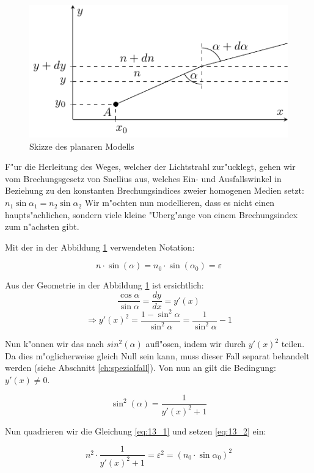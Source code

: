 \begin{refsection}
\begin{figure}
\centering
\includegraphics{licht/standalone/fig_planar_skizze.pdf}
\caption{Skizze des planaren Modells}
\label{fig:13_1}
\end{figure}

F"ur die Herleitung des Weges, welcher der Lichtstrahl zur"ucklegt, gehen wir vom Brechungsgesetz von Snellius aus, welches Ein- und Ausfallswinkel in Beziehung zu den konstanten Brechungsindices zweier homogenen Medien setzt: $n_1 \sin \alpha_1 = n_2 \sin \alpha_2$
Wir m"ochten nun modellieren, dass es nicht einen haupts"achlichen, sondern viele kleine "Uberg"ange von einem Brechungsindex zum n"achsten gibt. 

Mit der in der Abbildung \ref{fig:13_1} verwendeten Notation:

\begin{equation} \label{eq:13_1}
  n \cdot \sin(\alpha) = n_0 \cdot \sin(\alpha_0) = \varepsilon
\end{equation}

Aus der Geometrie in der Abbildung \ref{fig:13_1} ist ersichtlich:
$$\frac{\cos \alpha}{\sin \alpha} = \frac{dy}{dx} = y'(x)$$
$$\Rightarrow y'(x)^2 = \frac{1 - \sin^2 \alpha}{\sin^2 \alpha} = \frac{1}{\sin^2 \alpha} - 1$$

Nun k"onnen wir das nach $sin^2(\alpha)$ aufl"osen, indem wir durch $y'(x)^2$ teilen. 
Da dies m"oglicherweise gleich Null sein kann, muss dieser Fall separat behandelt werden (siehe Abschnitt \ref{ch:spezialfall}). 
Von nun an gilt die Bedingung: $y'(x) \neq 0$.

\begin{equation} \label{eq:13_2}
\sin^2 (\alpha) = \frac{1}{y'(x)^2 + 1}
\end{equation}

Nun quadrieren wir die Gleichung \ref{eq:13_1} und setzen \ref{eq:13_2} ein:

$$n^2 \cdot \frac{1}{y'(x)^2 + 1} = \varepsilon^2 = (n_0 \cdot \sin \alpha_0)^2$$


\end{refsection}
